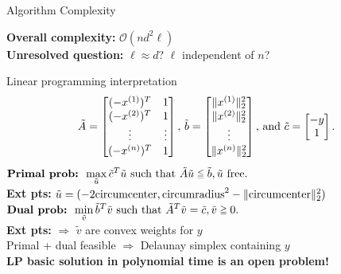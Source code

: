 \documentclass[xcolor=dvipsnames]{beamer}
\def\lee{\mathrel{\vcenter{\hbox{$\scriptstyle\mathord<$}\nointerlineskip
\vskip 1pt\hbox{$\scriptstyle\mathord=$}}}}
\def\gee{\mathrel{\vcenter{\hbox{$\scriptstyle\mathord>$}\nointerlineskip
\vskip 1pt\hbox{$\scriptstyle\mathord=$}}}}
\begin{document}
\begin{frame}{Algorithm Complexity}
\medskip
\pause
{\bf Overall complexity:} $\mathcal{O}(nd^2 \ell)$\\
\medskip
\pause
{\bf Unresolved question:} $\ell \approx d$? $\ell$ independent of $n$?
\end{frame}
\begin{frame}{Linear programming interpretation}
$$
{\tilde A} = \left[ \begin{matrix}
(-x^{(1)})^T & 1 \cr
(-x^{(2)})^T & 1 \cr
\vdots & \vdots \cr
(-x^{(n)})^T & 1 \cr
\end{matrix}\right]\text{, }
{\tilde b} = \left[ \begin{matrix}
\| x^{(1)} \|_2^2 \cr
\| x^{(2)} \|_2^2 \cr
\vdots \cr
\| x^{(n)} \|_2^2 \cr
\end{matrix}\right]\text{, and }
{\tilde c} = \left[ \begin{matrix}
-y \cr
1 \cr
\end{matrix}\right].
$$
\pause
$\displaystyle \hbox{\bf Primal prob: }
\max_{\tilde u} {\tilde c}^T {\tilde u}
\hbox{ such that }
{\tilde A}{\tilde u} \lee {\tilde b}, {\tilde u}\hbox{ free}.$\\
{\bf Ext pts:}
${\tilde u} = (-2\hbox{circumcenter}, \hbox{circumradius}^2 - \|\hbox{circumcenter}\|_2^2)$\\
\medskip
\pause
$\displaystyle \hbox{\bf Dual prob: }
\min_{\tilde v} {\tilde b}^T {\tilde v}
\hbox{ such that }
{\tilde A}^T{\tilde v} = {\tilde c}, {\tilde v}\gee 0.$\\
{\bf Ext pts:}
$\Rightarrow$ ${\tilde v}$ are convex weights for $y$\\
\medskip
\pause
Primal + dual feasible $\Rightarrow$ Delaunay simplex containing $y$\\
\medskip
\pause
{\bf LP basic solution in polynomial time is an open problem!}
\end{frame}
\end{document}
